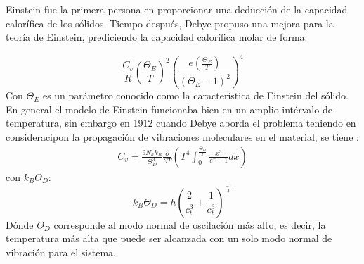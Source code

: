 Einstein fue la primera persona en proporcionar una deducción de la capacidad calorífica de los sólidos. Tiempo después, Debye propuso una mejora para la teoría de Einstein, prediciendo la capacidad calorífica molar de forma:

\begin{equation}
    \frac{C_v}{R}(\frac{\Theta_E}{T})^2(\frac{e(\frac{\Theta_E}{T})}{(\Theta_E-1)^2})^4
\end{equation}
Con $\Theta_E$ es un parámetro conocido como la característica de Einstein del sólido. En general el modelo de Einstein funcionaba bien en un amplio intérvalo de temperatura, sin embargo en 1912 cuando Debye aborda el problema teniendo en consideracipon la propagación de vibraciones moleculares en el material, se tiene :
\begin{align}
    C_v=\frac{9N_ak_B}{\Theta_D^3}\frac{\partial}{\partial T}(T^4 \int_{0}^{\frac{\Theta_D}{T}} \frac{x^3}{e^x-1}dx)
\end{align}
con $k_B\Theta_D$:
\begin{equation}
    k_B\Theta_D=h(\frac{2}{c^3_t}+\frac{1}{c^3_t})^\frac{-1}{3}
\end{equation}
Dónde $\Theta_D$ corresponde al modo normal de oscilación más alto, es decir, la temperatura más alta que puede ser alcanzada con un solo modo normal de vibración para el sistema.
